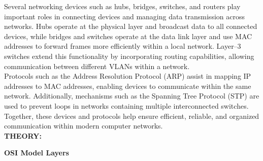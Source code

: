 \documentclass[a4paper,12pt]{article}
\begin{document}
\noindent
Several networking devices such as hubs, bridges, switches, and routers play important roles in connecting devices and managing data transmission across networks. Hubs operate at the physical layer and broadcast data to all connected devices, while bridges and switches operate at the data link layer and use MAC addresses to forward frames more efficiently within a local network. Layer--3 switches extend this functionality by incorporating routing capabilities, allowing communication between different VLANs within a network.\\

\noindent
Protocols such as the Address Resolution Protocol (ARP) assist in mapping IP addresses to MAC addresses, enabling devices to communicate within the same network. Additionally, mechanisms such as the Spanning Tree Protocol (STP) are used to prevent loops in networks containing multiple interconnected switches. Together, these devices and protocols help ensure efficient, reliable, and organized communication within modern computer networks.\\

\noindent
\textbf{THEORY: }

\noindent
\textbf{OSI Model Layers}
\end{document}
